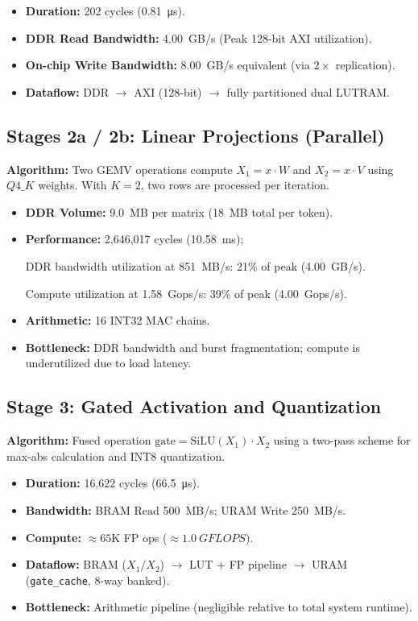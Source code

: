 \documentclass[conference]{IEEEtran}
\begin{document}
\begin{itemize}
    \item \textbf{Duration:} 202 cycles (\SI{0.81}{\micro\second}).
    \item \textbf{DDR Read Bandwidth:} \SI{4.00}{GB/s} (Peak 128-bit AXI utilization).
    \item \textbf{On-chip Write Bandwidth:} \SI{8.00}{GB/s} equivalent (via $2\times$ replication).
    \item \textbf{Dataflow:} DDR $\rightarrow$ AXI (128-bit) $\rightarrow$  fully partitioned dual LUTRAM.

\end{itemize}

\subsection*{Stages 2a / 2b: Linear Projections (Parallel)}
\textbf{Algorithm:} Two GEMV operations compute $X_1 = x \cdot W$ and $X_2 = x \cdot V$ using $Q4\_K$ weights. With $K=2$, two rows are processed per iteration.

\begin{itemize}
    \item \textbf{DDR Volume:} \SI{9.0}{MB} per matrix (\SI{18}{MB} total per token).
    \item \textbf{Performance:} 2,646,017 cycles (\SI{10.58}{ms}); 
    
    DDR bandwidth utilization at \SI{851}{MB/s}: 21\% of peak (\SI{4.00}{GB/s}).
    
Compute utilization at \SI{1.58}{Gops/s}: 39\% of peak (\SI{4.00}{Gops/s}).
    \item \textbf{Arithmetic:} 16 INT32 MAC chains.
    \item \textbf{Bottleneck:} DDR bandwidth and burst fragmentation; compute is underutilized due to load latency.
\end{itemize}

\subsection*{Stage 3: Gated Activation and Quantization}
\textbf{Algorithm:} Fused operation $\text{gate} = \text{SiLU}(X_1) \cdot X_2$ using a two-pass scheme for max-abs calculation and INT8 quantization.

\begin{itemize}
    \item \textbf{Duration:} 16,622 cycles (\SI{66.5}{\micro\second}).
    \item \textbf{Bandwidth:} BRAM Read \SI{500}{MB/s}; URAM Write \SI{250}{MB/s}.
    \item \textbf{Compute:} $\approx 65\text{K}$ FP ops ($\approx \SI{1.0}{GFLOPS}$).
    \item \textbf{Dataflow:} BRAM ($X_1/X_2$) $\rightarrow$ LUT + FP pipeline $\rightarrow$ URAM (\texttt{gate\_cache}, 8-way banked).
    \item \textbf{Bottleneck:} Arithmetic pipeline (negligible relative to total system runtime).
\end{itemize}
\end{document}
